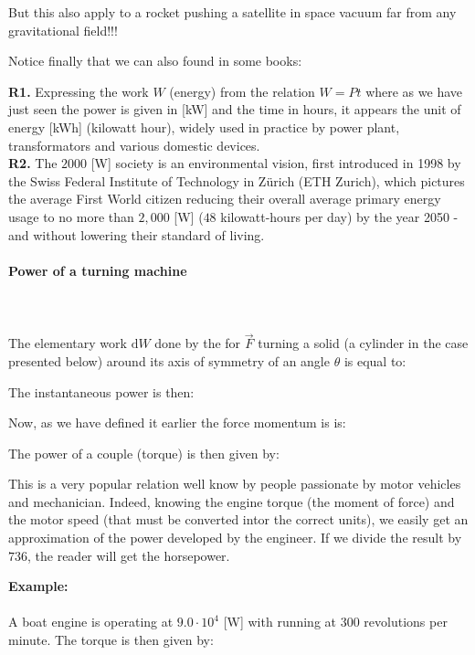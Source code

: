 	But this also apply to a rocket pushing a satellite in space vacuum far from any gravitational field!!!
	
	Notice finally that we can also found in some books:
	
	
	\begin{tcolorbox}[title=Remarks,colframe=black,arc=10pt]
	\textbf{R1.} Expressing the work $W$ (energy) from the relation $W=Pt$ where as we have just seen the power is given in [kW] and the time in hours, it appears the unit of energy [kWh] (kilowatt hour), widely used in practice by power plant, transformators and various domestic devices.\\
	
	\textbf{R2.} The $2000$ [W] society is an environmental vision, first introduced in 1998 by the Swiss Federal Institute of Technology in Zürich (ETH Zurich), which pictures the average First World citizen reducing their overall average primary energy usage to no more than $2,000$ [W] ($48$ kilowatt-hours per day) by the year 2050 - and without lowering their standard of living.
	\end{tcolorbox}
	
	\paragraph{Power of a turning machine}\mbox{}\\\\
	The elementary work $\mathrm{d}W$ done by the for $\vec{F}$ turning a solid (a cylinder in the case presented below) around its axis of symmetry of an angle $\theta$ is equal to:
	
	The instantaneous power is then:
	
	Now, as we have defined it earlier the force momentum is is:
	
	The power of a couple (torque) is then given by:
	
	This is a very popular relation well know by people passionate by motor vehicles and mechanician. Indeed, knowing the engine torque (the moment of force) and the motor speed (that must be converted intor the correct units), we easily get an approximation of the power developed by the engineer. If we divide the result by $736$, the reader will get the horsepower.
	\begin{tcolorbox}[colframe=black,colback=white,sharp corners]
	\textbf{{\Large {}}Example:}\\\\
	A boat engine is operating at $9.0\cdot 10^4$ [W] with running at $300$ revolutions per minute. The torque is then given by:
	
	\end{tcolorbox}
	
